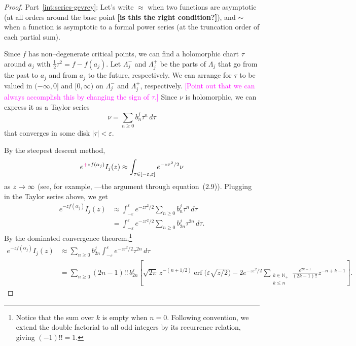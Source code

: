 \documentclass{article}
\let\Re\relax
\DeclareMathOperator{\Re}{Re}
\theoremstyle{definition}
\theoremstyle{plain}
\begin{document}
\begin{proof}

Part~\eqref{int:series-gevrey}: Let's write $\approx$ when two functions are asymptotic (at all orders around the base point \textbf{[is this the right condition?]}), and $\sim$ when a function is asymptotic to a formal power series (at the truncation order of each partial sum).

Since $f$ has non--degenerate critical points, we can find a holomorphic chart $\tau$ around $a_j$ with $\tfrac{1}{2} \tau^2 = f - f(a_j)$. Let $\Lambda^-_j$ and $\Lambda^+_j$ be the parts of $\Lambda_j$ that go from the past to $a_j$ and from $a_j$ to the future, respectively. We can arrange for $\tau$ to be valued in $(-\infty, 0]$ and $[0, \infty)$ on $\Lambda^-_j$ and $\Lambda^+_j$, respectively. \textcolor{magenta}{[Point out that we can always accomplish this by changing the sign of $\tau$.]} Since $\nu$ is holomorphic, we can express it as a Taylor series
\[ \nu = \sum_{n \ge 0} b_n^j \tau^n\,d\tau \]
that converges in some disk $|\tau| < \varepsilon$.

By the steepest descent method,
\[ e^{\textcolor{magenta}{+}z f(\alpha_j)} I_j(z) \approx \int_{\tau \in [-\varepsilon, \varepsilon]} e^{-z\tau^2/2} \nu \]
as $\Re z \to \infty$ (see, for example, \cite[Proposition 2.1]{miller2006applied}---the argument through equation~(2.9)). Plugging in the Taylor series above, we get
\begin{align*}
e^{-z f(\alpha_j)} I_j(z) & \approx \int_{-\varepsilon}^\varepsilon e^{-z\tau^2/2} \sum_{n \ge 0} b_n^j \tau^n\,d\tau \\
& = \int_{-\varepsilon}^\varepsilon e^{-z\tau^2/2} \sum_{n \ge 0} b_{2n}^j \tau^{2n}\,d\tau.
\end{align*}
By the dominated convergence theorem,\footnote{Notice that the sum over $k$ is empty when $n = 0$. Following convention, we extend the double factorial to all odd integers by its recurrence relation, giving $(-1)!! = 1$.}
\begin{align*}
e^{-z f(\alpha_j)} I_j(z) & \approx \sum_{n \ge 0} b_{2n}^j \int_{-\varepsilon}^\varepsilon e^{-z\tau^2/2} \tau^{2n}\,d\tau \\
& = \sum_{n \ge 0} (2n-1)!!\,b_{2n}^j \left[ \sqrt{2\pi}\,z^{-(n+1/2)} \operatorname{erf}\big(\varepsilon \sqrt{z/2}\big) - 2e^{-z\varepsilon^2/2} \sum_{\substack{k \in \mathbb{N}_+ \\ k \le n}} \frac{\varepsilon^{2k-1}}{(2k-1)!!} z^{-n+k-1} \right].
\end{align*}


\end{proof}
\end{document}
